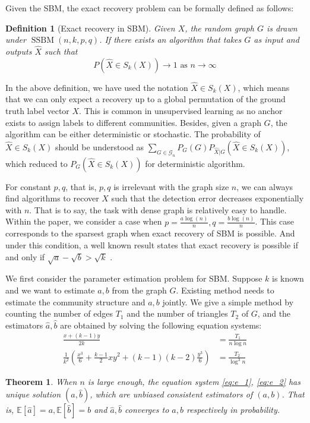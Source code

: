 \documentclass[journal]{IEEEtran}
\newtheorem{theorem}{Theorem}
\newtheorem{definition}{Definition}
\newcommand{\A}{\frac{a \log(n)}{n}}
\newcommand{\B}{\frac{b \log(n)}{n}}
\newcommand{\cG}{\mathcal{G}}
\newcommand{\1}{\mathbbm{1}}
\DeclareMathOperator{\SSBM}{SSBM}
\begin{document}
Given the SBM, the exact recovery problem can be formally defined as follows:
\begin{definition}[Exact recovery in SBM] \label{def:SSBMR}
Given $X$, the random graph $G$ is drawn under $\SSBM(n,k,p,q)$. If there exists an algorithm that takes
$G$ as input and outputs $\hat{X}$ such that
\begin{equation*}
P(\hat{X} \in S_k(X)) \to 1 \textrm{ as } n \to \infty
\end{equation*}
\end{definition}

In the above definition, we have used the notation $\hat{X} \in S_k(X)$, which means that we can only
expect a recovery up to a global permutation of the ground truth label vector $X$. This is common in unsupervised
learning as no anchor exists to assign labels to different communities. Besides, given a graph $G$, the algorithm can
be either deterministic or stochastic. The probability of $\hat{X} \in S_k(X)$ should be understood as 
$\sum_{G \in \cG_n} P_G(G) P_{\hat{X}|G}(\hat{X} \in S_k(X))$, which reduced to 
$P_G(\hat{X} \in S_k(X))$ for deterministic algorithm.

For constant $p,q$, that is, $p,q$ is irrelevant with the graph size $n$,
we can always find algorithms to recover $X$ such that the detection error decreases exponentially with $n$.
That is to say, the task with dense graph is relatively easy to handle. Within the paper, we consider a case
when $p = \A, q = \B$. This case corresponds to the sparsest graph when exact recovery of SBM is possible.
And under this condition, a well known result states that
exact recovery is possible if and only if $\sqrt{a} - \sqrt{b} > \sqrt{k}$ \cite{abbe2015community}.

We first consider the parameter estimation problem for SBM. Suppose $k$ is known and we want to estimate $a,b$ from the graph $G$.
Existing method needs to estimate the community structure and $a,b$ jointly. We give a simple method
by counting the number of edges $T_1$ and the number of triangles $T_2$ of $G$, and the estimators $\hat{a}, \hat{b}$ are
obtained by solving the following equation systems:
\begin{align}
\frac{x+(k-1)y}{2k} & = \frac{T_1}{n\log n} \label{eq:e_1}\\
\frac{1}{k^2}
\left(\frac{x^3}{6} + \frac{k-1}{2}xy^2 + (k-1)(k-2)\frac{y^3}{6}\right) & = \frac{T_2}{\log^3 n} \label{eq:e_2}
\end{align}
\begin{theorem}\label{thm:ab12}
When $n$ is large enough, the equation system \eqref{eq:e_1}, \eqref{eq:e_2} has unique solution $(\hat{a}, \hat{b})$, which are unbiased consistent estimators
of $(a,b)$. That is,
$\mathbb{E}[\hat{a}] = a, \mathbb{E}[\hat{b}] = b$ and $\hat{a}, \hat{b}$ converges to $a,b$ respectively in probability.	
\end{theorem}
\end{document}
